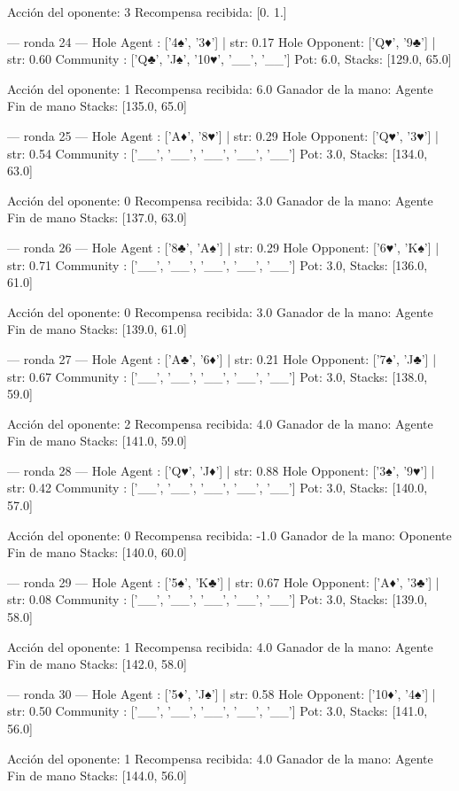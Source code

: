 Acción del oponente: 3
Recompensa recibida: [0. 1.]

--- ronda 24 ---
Hole Agent : ['4♠', '3♦'] | str: 0.17
Hole Opponent: ['Q♥', '9♣'] | str: 0.60
Community  : ['Q♣', 'J♠', '10♥', '__', '__']
Pot: 6.0, Stacks: [129.0, 65.0]

Acción del oponente: 1
Recompensa recibida: 6.0
Ganador de la mano: Agente
Fin de mano Stacks: [135.0, 65.0]


--- ronda 25 ---
Hole Agent : ['A♦', '8♥'] | str: 0.29
Hole Opponent: ['Q♥', '3♥'] | str: 0.54
Community  : ['__', '__', '__', '__', '__']
Pot: 3.0, Stacks: [134.0, 63.0]

Acción del oponente: 0
Recompensa recibida: 3.0
Ganador de la mano: Agente
Fin de mano Stacks: [137.0, 63.0]


--- ronda 26 ---
Hole Agent : ['8♣', 'A♠'] | str: 0.29
Hole Opponent: ['6♥', 'K♠'] | str: 0.71
Community  : ['__', '__', '__', '__', '__']
Pot: 3.0, Stacks: [136.0, 61.0]

Acción del oponente: 0
Recompensa recibida: 3.0
Ganador de la mano: Agente
Fin de mano Stacks: [139.0, 61.0]


--- ronda 27 ---
Hole Agent : ['A♣', '6♦'] | str: 0.21
Hole Opponent: ['7♠', 'J♣'] | str: 0.67
Community  : ['__', '__', '__', '__', '__']
Pot: 3.0, Stacks: [138.0, 59.0]

Acción del oponente: 2
Recompensa recibida: 4.0
Ganador de la mano: Agente
Fin de mano Stacks: [141.0, 59.0]


--- ronda 28 ---
Hole Agent : ['Q♥', 'J♦'] | str: 0.88
Hole Opponent: ['3♠', '9♥'] | str: 0.42
Community  : ['__', '__', '__', '__', '__']
Pot: 3.0, Stacks: [140.0, 57.0]

Acción del oponente: 0
Recompensa recibida: -1.0
Ganador de la mano: Oponente
Fin de mano Stacks: [140.0, 60.0]


--- ronda 29 ---
Hole Agent : ['5♠', 'K♣'] | str: 0.67
Hole Opponent: ['A♦', '3♣'] | str: 0.08
Community  : ['__', '__', '__', '__', '__']
Pot: 3.0, Stacks: [139.0, 58.0]

Acción del oponente: 1
Recompensa recibida: 4.0
Ganador de la mano: Agente
Fin de mano Stacks: [142.0, 58.0]


--- ronda 30 ---
Hole Agent : ['5♦', 'J♠'] | str: 0.58
Hole Opponent: ['10♦', '4♠'] | str: 0.50
Community  : ['__', '__', '__', '__', '__']
Pot: 3.0, Stacks: [141.0, 56.0]

Acción del oponente: 1
Recompensa recibida: 4.0
Ganador de la mano: Agente
Fin de mano Stacks: [144.0, 56.0]


